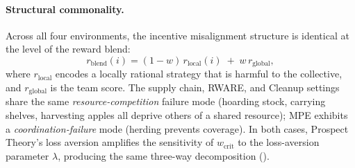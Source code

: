 \documentclass[11pt]{article}
\begin{document}
\paragraph{Structural commonality.}
Across all four environments, the incentive misalignment structure is identical
at the level of the reward blend:
\begin{equation}
  r_{\text{blend}}(i) = (1-w)\,r_{\text{local}}(i) \;+\; w\,r_{\text{global}},
\end{equation}
where $r_{\text{local}}$ encodes a locally rational strategy that is harmful
to the collective, and $r_{\text{global}}$ is the team score.
The supply chain, RWARE, and Cleanup settings share the same
\emph{resource-competition} failure mode (hoarding stock, carrying shelves,
harvesting apples all deprive others of a shared resource); MPE exhibits a
\emph{coordination-failure} mode (herding prevents coverage).
In both cases, Prospect Theory's loss aversion amplifies the sensitivity of
$w_{\text{crit}}$ to the loss-aversion parameter $\lambda$, producing the
same three-way decomposition ().



\end{document}
